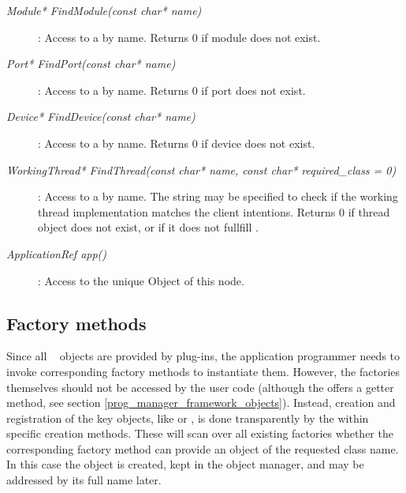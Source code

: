 \begin{description}

\item[\em Module* FindModule\small (const char* name)] :
Access to a  by name. Returns $0$ if module does not exist.
   
\item[\em Port* FindPort\small (const char* name)]:
Access to a  by name. Returns $0$ if port does not exist.
 
\item[\em Device* FindDevice\small (const char* name)] :
Access to a  by name. Returns $0$ if device does not exist.


\item[\em WorkingThread* FindThread\small (const char* name, const char* required\_class = 0)] :
Access to a  by name. The  string may
be specified to check if the working thread implementation matches the client
intentions. Returns $0$ if thread object does not exist, or if it does not fullfill
.


\item[\em ApplicationRef app()] : 
Access to the unique  Object of this node.


	 
\end{description}

\subsection{Factory methods}	 
Since all \dabc~ objects are provided by   plug-ins,
the application programmer needs to invoke corresponding factory methods to
instantiate them. However, the factories themselves should not be accessed by the
user code (although the  offers a getter method, see section
\ref{prog_manager_framework_objects}). Instead, creation and registration
of the key objects, like  or , 
is done transparently by the  
within specific creation methods. These will scan over all existing factories 
whether the corresponding factory method can provide an object of the requested class name.
In this case the object is created, kept in the object manager, and may be
addressed by its full name later.



